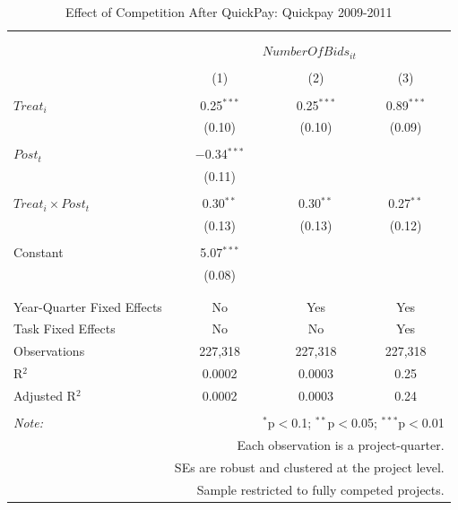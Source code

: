 \documentclass[
]{article}
\begin{document}
\begin{table}[H] \centering 
  \caption{Effect of Competition After QuickPay: Quickpay 2009-2011} 
  \label{} 
\small 
\begin{tabular}{@{\extracolsep{-2pt}}lccc} 
\\[-1.8ex]\hline 
\hline \\[-1.8ex] 
\\[-1.8ex] & \multicolumn{3}{c}{$NumberOfBids_{it}$} \\ 
\\[-1.8ex] & (1) & (2) & (3)\\ 
\hline \\[-1.8ex] 
 $Treat_i$ & 0.25$^{***}$ & 0.25$^{***}$ & 0.89$^{***}$ \\ 
  & (0.10) & (0.10) & (0.09) \\ 
  & & & \\ 
 $Post_t$ & $-$0.34$^{***}$ &  &  \\ 
  & (0.11) &  &  \\ 
  & & & \\ 
 $Treat_i \times Post_t$ & 0.30$^{**}$ & 0.30$^{**}$ & 0.27$^{**}$ \\ 
  & (0.13) & (0.13) & (0.12) \\ 
  & & & \\ 
 Constant & 5.07$^{***}$ &  &  \\ 
  & (0.08) &  &  \\ 
  & & & \\ 
\hline \\[-1.8ex] 
Year-Quarter Fixed Effects & No & Yes & Yes \\ 
Task Fixed Effects & No & No & Yes \\ 
Observations & 227,318 & 227,318 & 227,318 \\ 
R$^{2}$ & 0.0002 & 0.0003 & 0.25 \\ 
Adjusted R$^{2}$ & 0.0002 & 0.0003 & 0.24 \\ 
\hline 
\hline \\[-1.8ex] 
\textit{Note:}  & \multicolumn{3}{r}{$^{*}$p$<$0.1; $^{**}$p$<$0.05; $^{***}$p$<$0.01} \\ 
 & \multicolumn{3}{r}{Each observation is a project-quarter.} \\ 
 & \multicolumn{3}{r}{SEs are robust and clustered at the project level.} \\ 
 & \multicolumn{3}{r}{Sample restricted to fully competed projects.} \\ 
\end{tabular} 
\end{table}
\end{document}
